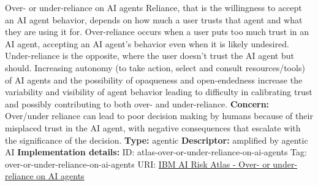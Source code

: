 \begin{definitionbox}{Over- or under-reliance on AI agents}
Reliance, that is the willingness to accept an AI agent behavior, depends on how much a user trusts that agent and what they are using it for. Over-reliance occurs when a user puts too much trust in an AI agent, accepting an AI agent's behavior even when it is likely undesired. Under-reliance is the opposite, where the user doesn't trust the AI agent but should. Increasing autonomy (to take action, select and consult resources/tools) of AI agents and the possibility of opaqueness and open-endedness increase the variability and visibility of agent behavior leading to difficulty in calibrating trust and possibly contributing to both over- and under-reliance.\newline\newline
\textbf{Concern: }Over/under reliance can lead to poor decision making by humans because of their misplaced trust in the AI agent, with negative consequences that escalate with the significance of the decision.\newline\newline
\textbf{Type: }agentic\newline
\textbf{Descriptor: }amplified by agentic AI \newline\newline
\textbf{Implementation details: } \newline
ID: atlas-over-or-under-reliance-on-ai-agents \newline
Tag: over-or-under-reliance-on-ai-agents \newline
URI:  \href{https://www.ibm.com/docs/en/watsonx/saas?topic=SSYOK8/wsj/ai-risk-atlas/over-or-under-reliance-on-ai-agents.html}{IBM AI Risk Atlas - Over- or under-reliance on AI agents}\newline
\end{definitionbox}
